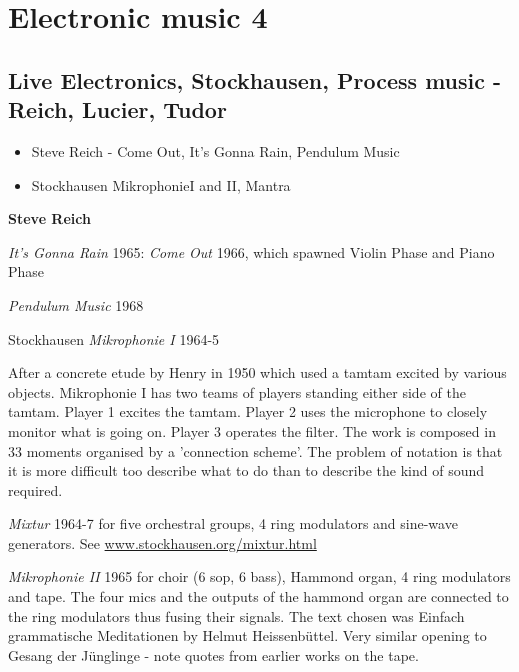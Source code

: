 
\chapter{Electronic music 4}
\label{history4}

\section{Live Electronics, Stockhausen, Process music - Reich, Lucier, Tudor }
\begin{itemize}
\item Steve Reich - Come Out, It's Gonna Rain, Pendulum Music
\item Stockhausen MikrophonieI and II, Mantra
\end{itemize}

\textbf{Steve Reich}

\textit{It's Gonna Rain} 1965: \textit{Come Out} 1966,  which spawned Violin Phase and Piano Phase

\textit{Pendulum Music} 1968

Stockhausen \textit{Mikrophonie I} 1964-5

After a concrete etude by Henry in 1950 which used a tamtam excited by various objects. Mikrophonie I has two teams of players standing either side of the tamtam. Player 1 excites the tamtam. Player 2 uses the microphone to closely monitor what is going on. Player 3 operates the filter. The work is composed in 33 moments organised by a 'connection scheme'. The problem of notation is that it is more difficult too describe what to do than to describe the kind of sound required.

\textit{Mixtur} 1964-7 for five orchestral groups, 4 ring modulators and sine-wave generators. See \url{www.stockhausen.org/mixtur.html}

\textit{Mikrophonie II} 1965 for choir (6 sop, 6 bass), Hammond organ, 4 ring modulators and tape. The four mics and the outputs of the hammond organ are connected to the ring modulators thus fusing their signals. The text chosen was Einfach grammatische Meditationen by Helmut Heissenbüttel. Very similar opening to Gesang der Jünglinge - note quotes from earlier works on the tape.


